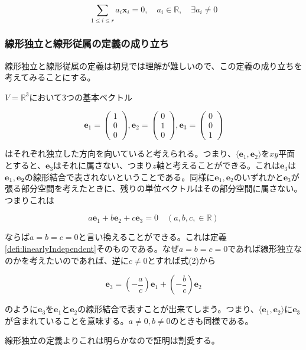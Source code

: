 \documentclass[dvipdfmx,autodetect-engine]{jsarticle}
\newcommand{\vecSet}[1]{\mathbb{R}^{#1}}
\begin{document}
$$
\sum_{1 \leq i \leq r} a_i\bm{x}_i = 0, \quad a_i \in \mathbb{R}, \quad \exists a_i \neq 0
$$

\subsubsection{線形独立と線形従属の定義の成り立ち}

線形独立と線形従属の定義は初見では理解が難しいので、この定義の成り立ちを考えてみることにする。

$V = \vecSet{3}$において3つの基本ベクトル

$$
\bm{e}_1 = \begin{pmatrix}
1 \\
0 \\
0
\end{pmatrix}, 
\bm{e}_2 = \begin{pmatrix}
0 \\
1 \\
0
\end{pmatrix}, 
\bm{e}_3 = \begin{pmatrix}
0 \\
0 \\
1
\end{pmatrix}
$$

はそれぞれ独立した方向を向いていると考えられる。つまり、$\langle \bm{e}_1, \bm{e}_2 \rangle$を$xy$平面とすると、$\bm{e}_3$はそれに属さない、つまり$z$軸と考えることができる。これは$\bm{e}_3$は$\bm{e_1}, \bm{e_2}$の線形結合で表されないということである。同様に$\bm{e}_1, \bm{e}_2$のいずれかと$\bm{e}_3$が張る部分空間を考えたときに、残りの単位ベクトルはその部分空間に属さない。つまりこれは

\begin{equation}
    a\bm{e}_1 + b\bm{e}_2 + c\bm{e}_3 = 0 \quad (a, b, c, \in \mathbb{R}) 
\end{equation}

ならば$a = b = c = 0$と言い換えることができる。これは定義\ref{defi:linearlyIndependent}そのものである。なぜ$a = b = c = 0$であれば線形独立なのかを考えたいのであれば、逆に$c \neq 0$とすれば式(2)から

$$
\bm{e}_3 = \left(-\frac{a}{c}\right)\bm{e}_1 + \left(-\frac{b}{c}\right)\bm{e}_2
$$

のように$\bm{e}_3$を$\bm{e}_1$と$\bm{e}_2$の線形結合で表すことが出来てしまう。つまり、$\langle \bm{e}_1, \bm{e}_2 \rangle$に$\bm{e}_3$が含まれていることを意味する。$a \neq 0, b \neq 0$のときも同様である。

線形独立の定義よりこれは明らかなので証明は割愛する。
\end{document}
